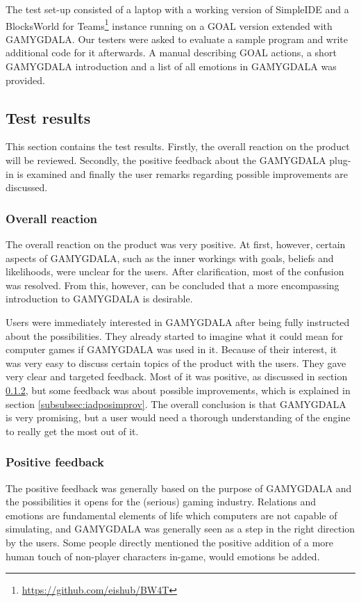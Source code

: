 The test set-up consisted of a laptop with a working version of SimpleIDE and a BlocksWorld for Teams\footnote{\url{https://github.com/eishub/BW4T}} instance running on a GOAL version extended with GAMYGDALA. Our testers were asked to evaluate a sample program and write additional code for it afterwards. A manual describing GOAL actions, a short GAMYGDALA introduction and a list of all emotions in GAMYGDALA was provided. \clearpage

\subsection{Test results}
\label{subsec:iadres}
This section contains the test results. Firstly, the overall reaction on the product will be reviewed. Secondly, the positive feedback about the GAMYGDALA plug-in is examined and finally the user remarks regarding possible improvements are discussed.

\subsubsection{Overall reaction}
The overall reaction on the product was very positive. At first, however, certain aspects of GAMYGDALA, such as the inner workings with goals, beliefs and likelihoods, were unclear for the users. After clarification, most of the confusion was resolved. From this, however, can be concluded that a more encompassing introduction to GAMYGDALA is desirable.

Users were immediately interested in GAMYGDALA after being fully instructed about the possibilities. They already started to imagine what it could mean for computer games if GAMYGDALA was used in it. Because of their interest, it was very easy to discuss certain topics of the product with the users. They gave very clear and targeted feedback.  Most of it was positive, as discussed in section \ref{subsubsec:iadposfeedb}, but some feedback was about possible improvements, which is explained in section \ref{subsubsec:iadposimprov}. The overall conclusion is that GAMYGDALA is very promising, but a user would need a thorough understanding of the engine to really get the most out of it.

\subsubsection{Positive feedback}
\label{subsubsec:iadposfeedb}
The positive feedback was generally based on the purpose of GAMYGDALA and the possibilities it opens for the (serious) gaming industry. Relations and emotions are fundamental elements of life which computers are not capable of simulating, and GAMYGDALA was generally seen as a step in the right direction by the users. Some people directly mentioned the positive addition of a more human touch of non-player characters in-game, would emotions be added.\\

